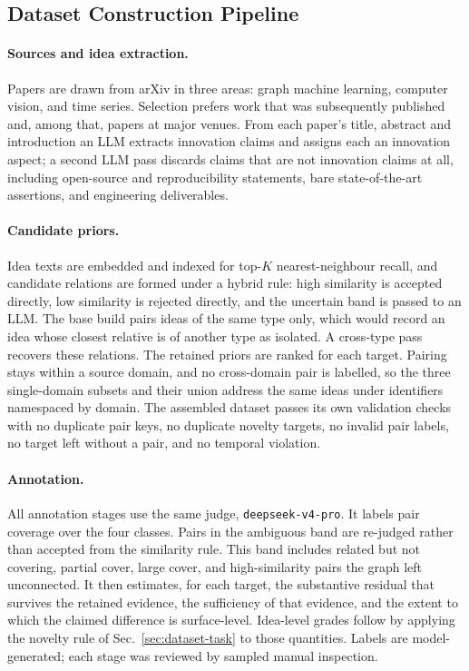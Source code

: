 
\subsection{Dataset Construction Pipeline}
\label{app:dataset}

\paragraph{Sources and idea extraction.}
Papers are drawn from arXiv in three areas: graph machine learning, computer
vision, and time series. Selection prefers work that was subsequently published
and, among that, papers at major venues. From each paper's title, abstract and
introduction an LLM extracts
innovation claims and assigns each an innovation aspect; a second LLM pass
discards claims that are not innovation claims at all, including open-source
and reproducibility statements, bare state-of-the-art assertions, and
engineering deliverables.

\paragraph{Candidate priors.}
Idea texts are embedded and indexed for top-$K$ nearest-neighbour recall, and
candidate relations are formed under a hybrid rule: high similarity is accepted
directly, low similarity is rejected directly, and the uncertain band is passed
to an LLM. The base build pairs ideas of the same type only, which would record
an idea whose closest relative is of another type as isolated. A cross-type
pass recovers these relations.
The retained priors are ranked for each target. Pairing stays within a source
domain, and no cross-domain pair is labelled, so the three single-domain subsets
and their union address the same ideas under identifiers namespaced by domain.
The assembled dataset passes its own validation checks with no duplicate pair
keys, no duplicate novelty targets, no invalid pair labels, no target left
without a pair, and no temporal violation.

\paragraph{Annotation.}
All annotation stages use the same judge, \texttt{deepseek-v4-pro}. It labels
pair coverage over the four classes. Pairs in the ambiguous band are
re-judged rather than accepted from the similarity rule. This band includes
related but not covering, partial cover, large cover, and high-similarity
pairs the graph left unconnected. It then
estimates, for each target, the substantive residual that survives the retained
evidence, the sufficiency of that evidence, and the extent to which the claimed
difference is surface-level. Idea-level grades follow by applying
the novelty rule of Sec.~\ref{sec:dataset-task} to those quantities. Labels are model-generated;
each stage was reviewed by sampled manual inspection.

